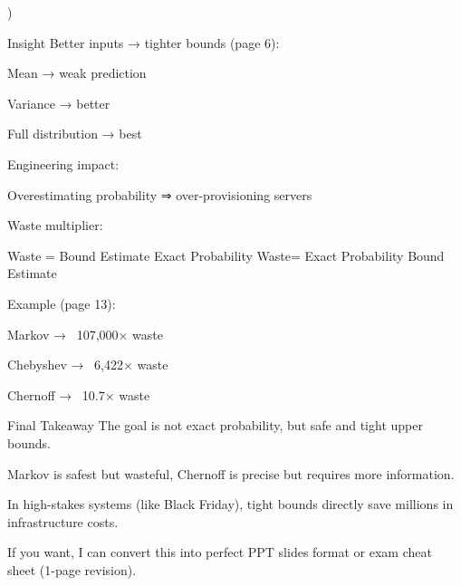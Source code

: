 )

Insight
Better inputs → tighter bounds (page 6):

Mean → weak prediction

Variance → better

Full distribution → best

Engineering impact:

Overestimating probability ⇒ over-provisioning servers

Waste multiplier:

Waste
=
Bound Estimate
Exact Probability
Waste= 
Exact Probability
Bound Estimate
​
 
Example (page 13):

Markov → ~107,000× waste

Chebyshev → ~6,422× waste

Chernoff → ~10.7× waste

Final Takeaway
The goal is not exact probability, but safe and tight upper bounds.

Markov is safest but wasteful, Chernoff is precise but requires more information.

In high-stakes systems (like Black Friday), tight bounds directly save millions in infrastructure costs.

If you want, I can convert this into perfect PPT slides format or exam cheat sheet (1-page revision).






